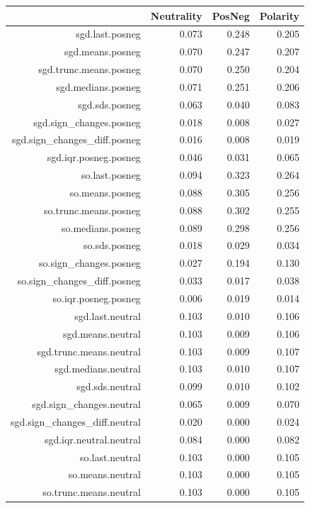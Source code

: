 \documentclass{sig-alternate}
\begin{document}
\begin{table}[ht]
\centering
\begin{tabular}{rrrr}
  \hline
 & Neutrality & PosNeg & Polarity \\ 
  \hline
sgd.last.posneg & 0.073 & 0.248 & 0.205 \\ 
  sgd.means.posneg & 0.070 & 0.247 & 0.207 \\ 
  sgd.trunc.means.posneg & 0.070 & 0.250 & 0.204 \\ 
  sgd.medians.posneg & 0.071 & 0.251 & 0.206 \\ 
  sgd.sds.posneg & 0.063 & 0.040 & 0.083 \\ 
  sgd.sign\_changes.posneg & 0.018 & 0.008 & 0.027 \\ 
  sgd.sign\_changes\_diff.posneg & 0.016 & 0.008 & 0.019 \\ 
  sgd.iqr.posneg.posneg & 0.046 & 0.031 & 0.065 \\ 
  so.last.posneg & 0.094 & 0.323 & 0.264 \\ 
  so.means.posneg & 0.088 & 0.305 & 0.256 \\ 
  so.trunc.means.posneg & 0.088 & 0.302 & 0.255 \\ 
  so.medians.posneg & 0.089 & 0.298 & 0.256 \\ 
  so.sds.posneg & 0.018 & 0.029 & 0.034 \\ 
  so.sign\_changes.posneg & 0.027 & 0.194 & 0.130 \\ 
  so.sign\_changes\_diff.posneg & 0.033 & 0.017 & 0.038 \\ 
  so.iqr.posneg.posneg & 0.006 & 0.019 & 0.014 \\ 
  sgd.last.neutral & 0.103 & 0.010 & 0.106 \\ 
  sgd.means.neutral & 0.103 & 0.009 & 0.106 \\ 
  sgd.trunc.means.neutral & 0.103 & 0.009 & 0.107 \\ 
  sgd.medians.neutral & 0.103 & 0.010 & 0.107 \\ 
  sgd.sds.neutral & 0.099 & 0.010 & 0.102 \\ 
  sgd.sign\_changes.neutral & 0.065 & 0.009 & 0.070 \\ 
  sgd.sign\_changes\_diff.neutral & 0.020 & 0.000 & 0.024 \\ 
  sgd.iqr.neutral.neutral & 0.084 & 0.000 & 0.082 \\ 
  so.last.neutral & 0.103 & 0.000 & 0.105 \\ 
  so.means.neutral & 0.103 & 0.000 & 0.105 \\ 
  so.trunc.means.neutral & 0.103 & 0.000 & 0.105 \\ 

\end{tabular}
\end{table}
\end{document}
